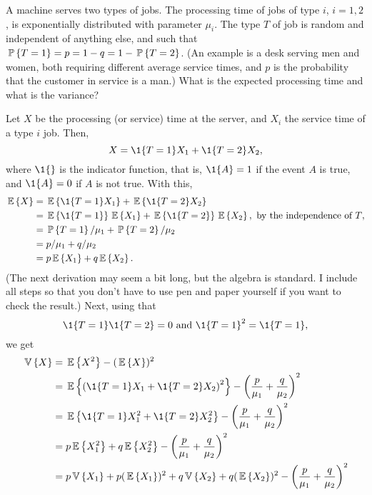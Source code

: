 \begin{question}
  A machine serves two types of jobs. The processing time of jobs of
  type $i$, $i=1,2$, is exponentially distributed with parameter
  $\mu_i$. The type $T$ of job is random and independent of anything
  else, and such that $\P{T=1} = p = 1-q = 1-\P{T=2}$. (An example
  is a desk serving men and women, both requiring different average
  service times, and $p$ is the probability that the customer in
  service is a man.) What is the expected processing time and what is the variance? 
  \begin{solution}
    Let $X$ be the processing (or service) time at the server, and
    $X_i$ the service time of a type $i$ job. Then, 
    \begin{equation*}
      X = \1{T=1} X_1 + \1{T=2} X_2,
    \end{equation*}
    where $\1{}$ is the indicator function, that is, $\1{A}=1$ if the
    event $A$ is true, and $\1{A}=0$ if $A$ is not true. With this,
\begin{equation*}
  \begin{split}
  \E X 
&= \E{\1{T=1} X_1} + \E{\1{T=2} X_2} \\
&= \E{\1{T=1}} \E{ X_1} + \E{\1{T=2}} \E{X_2}, \text{ by the independence of $T$}, \\
&= \P{T=1} /\mu_1 + \P{T=2}/ \mu_2 \\
&= p /\mu_1 + q/ \mu_2 \\
&= p \E{X_1}  + q \E{X_2}.
  \end{split}
\end{equation*}
(The next derivation may seem a bit long, but the algebra is
standard. I include all steps so that you don't have to use pen and
paper yourself if you want to check the result.) Next, using that
\begin{equation*}
\1{T=1}\1{T=2} = 0 \text{ and } \1{T=1}^2 = \1{T=1},
\end{equation*}
we get
\begin{equation*}
  \begin{split}
  \V X 
&= \E{X^2} - (\E X)^2 \\
&= \E{\left(\1{T=1} X_1 + \1{T=2} X_2\right)^2} - \left(\frac{p}{\mu_1}+\frac{q}{\mu_2}\right)^2 \\
&= \E{\1{T=1} X_1^2 + \1{T=2} X_2^2} - \left(\frac{p}{\mu_1}+\frac{q}{\mu_2}\right)^2 \\ 
&= p \E{X_1^2} + q \E{X_2^2} - \left(\frac{p}{\mu_1}+\frac{q}{\mu_2}\right)^2 \\ 
&= p \V{X_1} + p (\E{X_1})^2 + q \V{X_2} + q(\E{ X_2})^2 - \left(\frac{p}{\mu_1}+\frac{q}{\mu_2}\right)^2 \\ 

\end{split}
\end{equation*}
\end{solution}
\end{question}

